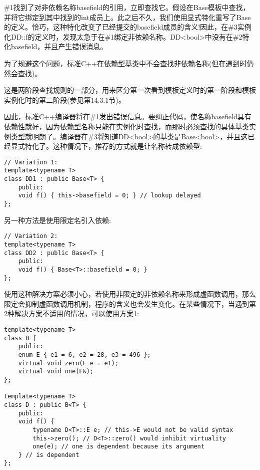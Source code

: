 \#1找到了对非依赖名称basefield的引用，立即查找它。假设在Base模板中查找，并将它绑定到其中找到的int成员上。此之后不久，我们使用显式特化重写了Base的定义。恰巧，这种特化改变了已经提交的basefield成员的含义!因此，在\#3实例化DD::f的定义时，发现太急于在\#1绑定非依赖名称。DD<bool>中没有在\#2特化basefield，并且产生错误消息。

为了规避这个问题，标准C++在依赖型基类中不会查找非依赖名称(但在遇到时仍然会查找)。

\begin{tcolorbox}[colback=webgreen!5!white,colframe=webgreen!75!black]
\hspace*{0.75cm}这是两阶段查找规则的一部分，用来区分第一次看到模板定义时的第一阶段和模板实例化时的第二阶段(参见第14.3.1节)。
\end{tcolorbox}

因此，标准C++编译器将在\#1发出错误信息。要纠正代码，使名称basefield具有依赖性就好，因为依赖型名称只能在实例化时查找，而那时必须查找的具体基类实例类型就明朗了。编译器在\#3将知道DD<bool>的基类是Base<bool>，并且这已经显式特化了。这种情况下，推荐的方式就是让名称转成依赖型:

\begin{lstlisting}[style=styleCXX]
// Variation 1:
template<typename T>
class DD1 : public Base<T> {
	public:
	void f() { this->basefield = 0; } // lookup delayed
};
\end{lstlisting}

另一种方法是使用限定名引入依赖:

\begin{lstlisting}[style=styleCXX]
// Variation 2:
template<typename T>
class DD2 : public Base<T> {
	public:
	void f() { Base<T>::basefield = 0; }
};
\end{lstlisting}

使用这种解决方案必须小心，若使用非限定的非依赖名称来形成虚函数调用，那么限定会抑制虚函数调用机制，程序的含义也会发生变化。在某些情况下，当遇到第2种解决方案不适用的情况，可以使用方案1:

\begin{lstlisting}[style=styleCXX]
template<typename T>
class B {
	public:
	enum E { e1 = 6, e2 = 28, e3 = 496 };
	virtual void zero(E e = e1);
	virtual void one(E&);
};

template<typename T>
class D : public B<T> {
	public:
	void f() {
		typename D<T>::E e; // this->E would not be valid syntax
		this->zero(); // D<T>::zero() would inhibit virtuality
		one(e); // one is dependent because its argument
	} // is dependent
};
\end{lstlisting}

